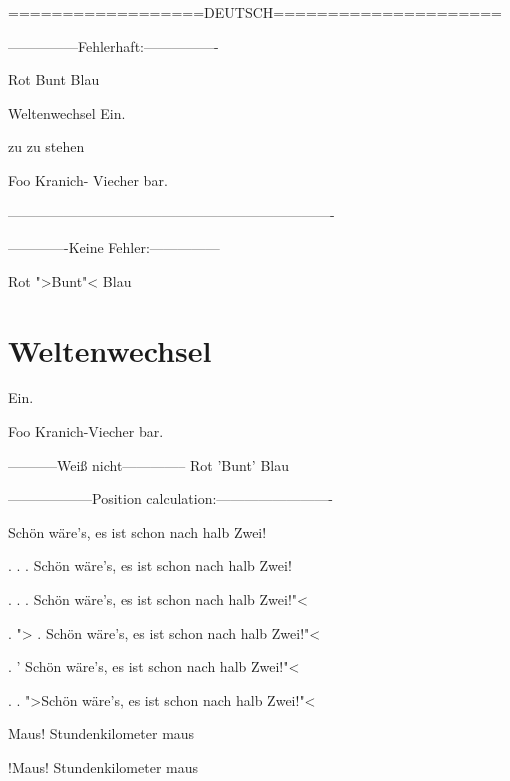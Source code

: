 
==================DEUTSCH=====================

---------------Fehlerhaft:----------------



Rot Bunt Blau


Weltenwechsel Ein.


zu zu stehen


Foo Kranich- Viecher bar. 

----------------------------------------------------------------------

-------------Keine Fehler:---------------



Rot ">Bunt"< Blau





\chapter{Weltenwechsel}
Ein.





Foo Kranich-Viecher bar. 



-----------Weiß nicht--------------
Rot 'Bunt' Blau




------------------Position calculation:-------------------------

Schön wäre's, es ist schon nach halb Zwei!

. . . Schön wäre's, es ist schon nach halb Zwei! 

. . . Schön wäre's, es ist schon nach halb Zwei!"< 

. "> . Schön wäre's, es ist schon nach halb Zwei!"< 

. ' Schön wäre's, es ist schon nach halb Zwei!"< 

. . ">Schön wäre's, es ist schon nach halb Zwei!"< 


Maus! Stundenkilometer maus


!Maus! Stundenkilometer maus


